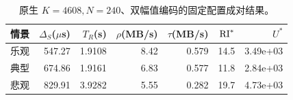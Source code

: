 \begin{table}[htbp]\centering\small
\begin{tabular}{@{}lrrrrrr@{}}\toprule
情景 & $\Delta_S$($\mu$s) & $T_R$(s) & $\rho$(MB/s) & $\tau$(MB/s) & $\mathrm{RI}^*$ & $U^*$\\\midrule
乐观 & 547.27 & 1.9108 & 8.42 & 0.579 & 14.5 & 3.49e+03\\
典型 & 674.86 & 1.9161 & 6.83 & 0.577 & 11.8 & 2.84e+03\\
悲观 & 829.91 & 3.9282 & 5.55 & 0.282 & 19.7 & 4.73e+03\\
\bottomrule\end{tabular}
\caption{原生 $K=4608,N=240$、双幅值编码的固定配置成对结果。}\end{table}
